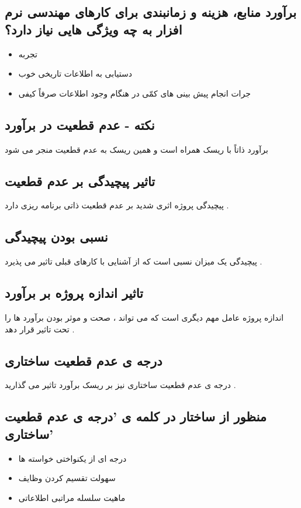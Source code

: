 \documentclass{article}
\begin{document}
\subsection{برآورد منابع، هزینه و زمانبندی برای کارهای مهندسی نرم افزار به چه ویژگی هایی نیاز دارد؟}

\begin{itemize}
	\item تجربه
	\item دستیابی به اطلاعات تاریخی خوب
	\item جرات انجام پیش بینی های کمّی در هنگام وجود اطلاعات صرفاً کیفی
\end{itemize}


\subsection{نکته - عدم قطعیت در برآورد}
برآورد ذاتاً با ریسک همراه است و همین ریسک به عدم قطعیت منجر می شود 


\subsection{تاثیر پیچیدگی بر عدم قطعیت}
پیچیدگی پروژه اثری شدید بر عدم قطعیت ذاتی برنامه ریزی دارد .

\subsection{نسبی بودن پیچیدگی}
پیچیدگی یک میزان نسبی است که از آشنایی با کارهای قبلی تاثیر می پذیرد .


\subsection{تاثیر اندازه پروژه بر برآورد}
اندازه پروژه عامل مهم دیگری است که  می تواند ، صحت و موثر بودن برآورد ها را تحت تاثیر قرار دهد .

\subsection{درجه ی عدم قطعیت ساختاری}
درجه ی عدم قطعیت ساختاری نیز بر ریسک برآورد تاثیر می گذارید . 


\subsection{منظور از ساختار در کلمه ی 'درجه ی عدم قطعیت ساختاری'}

\begin{itemize}
	\item درجه ای از یکنواختی خواسته ها
	\item سهولت تقسیم کردن وظایف
	\item ماهیت سلسله مراتبی اطلاعاتی
\end{itemize}
\end{document}
